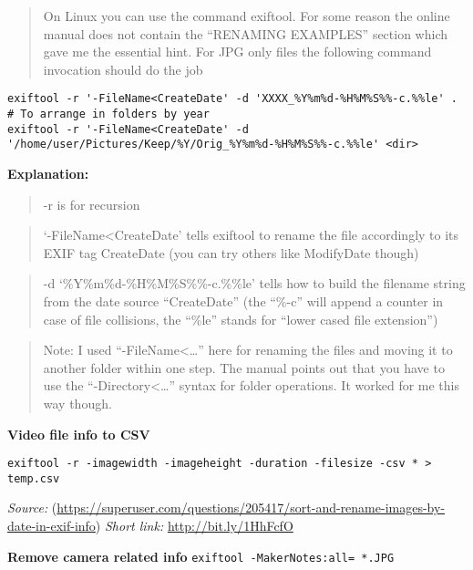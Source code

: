 \documentclass[]{book}
\theoremstyle{definition}
\theoremstyle{definition}
\theoremstyle{definition}
\theoremstyle{remark}
\begin{document}
\begin{quote}
On Linux you can use the command exiftool. For some reason the online
manual does not contain the ``RENAMING EXAMPLES'' section which gave me
the essential hint. For JPG only files the following command invocation
should do the job
\end{quote}

\begin{verbatim}
exiftool -r '-FileName<CreateDate' -d 'XXXX_%Y%m%d-%H%M%S%%-c.%%le' .
# To arrange in folders by year
exiftool -r '-FileName<CreateDate' -d '/home/user/Pictures/Keep/%Y/Orig_%Y%m%d-%H%M%S%%-c.%%le' <dir>
\end{verbatim}

\textbf{Explanation:}

\begin{quote}
-r is for recursion
\end{quote}

\begin{quote}
`-FileName\textless{}CreateDate' tells exiftool to rename the file
accordingly to its EXIF tag CreateDate (you can try others like
ModifyDate though)
\end{quote}

\begin{quote}
-d `\%Y\%m\%d-\%H\%M\%S\%\%-c.\%\%le' tells how to build the filename
string from the date source ``CreateDate'' (the ``\%-c'' will append a
counter in case of file collisions, the ``\%le'' stands for ``lower
cased file extension'')
\end{quote}

\begin{quote}
Note: I used ``-FileName\textless{}\ldots{}'' here for renaming the
files and moving it to another folder within one step. The manual points
out that you have to use the ``-Directory\textless{}\ldots{}'' syntax
for folder operations. It worked for me this way though.
\end{quote}

\textbf{Video file info to CSV}

\begin{verbatim}
exiftool -r -imagewidth -imageheight -duration -filesize -csv * > temp.csv
\end{verbatim}

\emph{Source:}
(\url{https://superuser.com/questions/205417/sort-and-rename-images-by-date-in-exif-info})
\emph{Short link:} \url{http://bit.ly/1HhFcfO}

\textbf{Remove camera related info}
\texttt{exiftool\ -MakerNotes:all=\textquotesingle{}\textquotesingle{}\ *.JPG}
\end{document}
